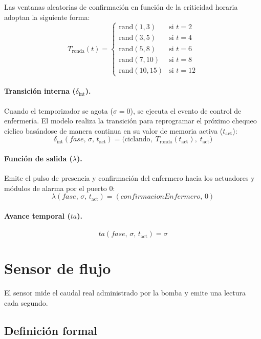 \documentclass{article}
\newcommand{\dint}{\delta_{\mathrm{int}}}
\begin{document}
Las ventanas aleatorias de confirmación en función de la criticidad horaria adoptan la siguiente forma:
\[
  T_{\mathrm{ronda}}(t) = 
  \begin{cases}
    \text{rand}(1, 3) & \text{si } t = 2 \\[4pt]
    \text{rand}(3, 5) & \text{si } t = 4 \\[4pt]
    \text{rand}(5, 8) & \text{si } t = 6 \\[4pt]
    \text{rand}(7, 10) & \text{si } t = 8 \\[4pt]
    \text{rand}(10, 15) & \text{si } t = 12
  \end{cases}
\]

\paragraph{Transición interna ($\dint$).}
Cuando el temporizador se agota ($\sigma = 0$), se ejecuta el evento de control de enfermería. El modelo realiza la transición para reprogramar el próximo chequeo cíclico basándose de manera continua en su valor de memoria activa ($t_{\mathrm{act}}$):
\[
  \dint(\mathit{fase},\, \sigma,\, t_{\mathrm{act}}) = \bigl(\text{ciclando},\; T_{\mathrm{ronda}}(t_{\mathrm{act}}),\; t_{\mathrm{act}}\bigr)
\]

\paragraph{Función de salida ($\lambda$).}
Emite el pulso de presencia y confirmación del enfermero hacia los actuadores y módulos de alarma por el puerto 0:
\[
  \lambda(\mathit{fase},\, \sigma,\, t_{\mathrm{act}}) = (\mathit{confirmacionEnfermero},\, 0)
\]

\paragraph{Avance temporal ($ta$).}
\[
  ta(\mathit{fase},\, \sigma,\, t_{\mathrm{act}}) = \sigma
\]

\section{Sensor de flujo}

El sensor mide el caudal real administrado por la bomba y emite una
lectura cada segundo.

\subsection{Definición formal}
\end{document}
